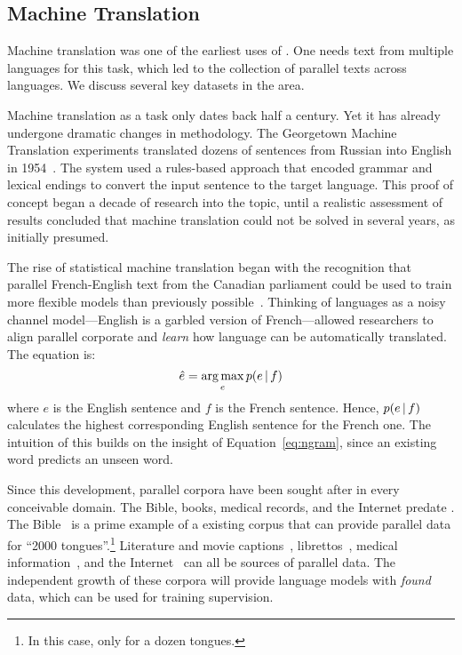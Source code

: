\subsection{Machine Translation}
\label{sec:mt}

Machine translation was one of the earliest uses of \nlp{}.  
%
One needs text from multiple languages for this task, which led to the collection of parallel texts across languages.  
%
We discuss several key datasets in the area.

Machine translation as a \nlp{} task only dates back half a century.
%
Yet it has already undergone dramatic changes in methodology.  
%
The Georgetown Machine Translation experiments translated dozens of sentences from Russian into English in 1954~\citep{hutchins2004georgetown}.
%
The system used a rules-based approach that encoded grammar and lexical endings to convert the input sentence to the target language.
%
This proof of concept began a decade of research into the topic, until a realistic assessment of results concluded that machine translation could not be solved in several years, as initially presumed.

The rise of statistical machine translation began with the recognition that parallel French-English text from the Canadian parliament could be used to train more flexible models than previously possible~\citep{berger1994candide}.
%
Thinking of languages as a noisy channel model---English is a garbled version of French---allowed researchers to align parallel corporate and \textit{learn} how language can be automatically translated.  The equation is:
\begin{equation}
\hat{e}=\operatorname*{arg\,max}_e p(e\, | \,{}f)
\end{equation}
where $e$ is the English sentence and $f$ is the French sentence.
%
Hence, $p(e\, | \,{}f)$ calculates the highest corresponding English sentence for the French one.  
%
The intuition of this builds on the insight of Equation~\ref{eq:ngram}, since an existing word predicts an unseen word.  

Since this development, parallel corpora have been sought after in every conceivable domain.  
%
The Bible, books, medical records, and the Internet predate \nlp{}.   
%
The Bible~\citep{resnik1999bible} is a prime example of a existing corpus that can provide parallel data for ``2000 tongues''.\footnote{In this case, only for a dozen tongues.} 
%
Literature and movie captions~\citep{varga2007parallel}, librettos~\citep{durr2005cantatas}, medical information~\citep{deleger2009translating},  and the Internet~\citep{resnik2003web, smith2013dirt} can all be sources of parallel data.
%
The independent growth of these corpora will provide language models with \textit{found} data, which can be used for training supervision.       

